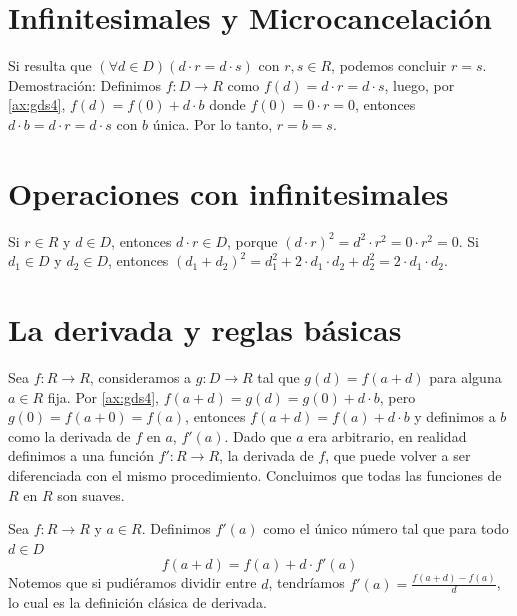 \section{Infinitesimales y Microcancelación}
Si resulta que $(\forall d \in D) (d\cdot r = d\cdot s)$ con $r,s\in R$, podemos concluir
$r=s$. Demostración: Definimos $f\colon  D\to R$ como $f(d)=d\cdot r = d\cdot s$, luego,
por \ref{ax:gds4}, $f(d) = f(0)+d\cdot b$ donde $f(0) = 0\cdot r = 0$, entonces $d\cdot b=d\cdot r = d\cdot s$
con $b$ única. Por lo tanto, $r=b=s$.

\section{Operaciones con infinitesimales}
Si $r\in R$ y $d\in D$, entonces $d\cdot r \in D$, porque $(d\cdot r)^2=d^2\cdot r^2=0\cdot r^2=0$.
Si $d_1\in D$ y $d_2\in D$, entonces $(d_1+d_2)^2=d_1^2+2\cdot d_1\cdot d_2+d_2^2=2\cdot d_1\cdot d_2$.

\section{La derivada y reglas básicas}
Sea $f\colon  R\to R$, consideramos a $g\colon  D\to R$ tal que $g(d)=f(a+d)$ para alguna
$a\in R$ fija. Por \ref{ax:gds4}, $f(a+d)=g(d)=g(0)+d\cdot b$, pero $g(0)=f(a+0)=f(a)$, entonces
$f(a+d)=f(a)+d\cdot b$ y definimos a $b$ como la derivada de $f$ en $a$, $f'(a)$. Dado que $a$ era
arbitrario, en realidad definimos a una función $f'\colon  R \to R$, la derivada de $f$, que
puede volver a ser diferenciada con el mismo procedimiento. Concluimos que todas las funciones
de $R$ en $R$ son suaves.

\begin{definition}[label=def:derivada]
  Sea $f\colon  R\to R$ y $a\in R$. Definimos $f'(a)$ como el único número tal que para todo $d\in D$
  \begin{equation*}
    f(a+d)=f(a)+d\cdot f'(a)
  \end{equation*}
  Notemos que si pudiéramos dividir entre $d$, tendríamos $f'(a) = \frac{f(a+d)-f(a)}{d}$, lo cual es la definición clásica de derivada.
\end{definition}


